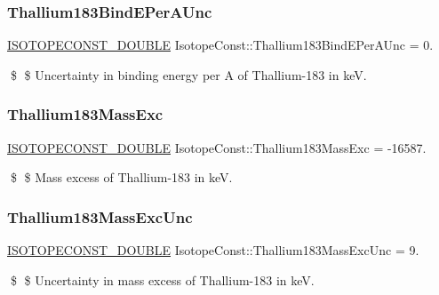 \subsubsection{\texorpdfstring{Thallium183\+Bind\+E\+Per\+A\+Unc}{Thallium183BindEPerAUnc}}
{\footnotesize\ttfamily \mbox{\hyperlink{group___isotope_const-_macros_ga8f45a7272ce02c0b4c65c44636ed719a}{I\+S\+O\+T\+O\+P\+E\+C\+O\+N\+S\+T\+\_\+\+D\+O\+U\+B\+LE}} Isotope\+Const\+::\+Thallium183\+Bind\+E\+Per\+A\+Unc = 0.}

\$ \$ Uncertainty in binding energy per A of Thallium-\/183 in keV. \mbox{\label{group___isotope_const-_thallium-_tl183_ga243d9df63fa4c64af9400a0b2d5807d2}} 
\subsubsection{\texorpdfstring{Thallium183\+Mass\+Exc}{Thallium183MassExc}}
{\footnotesize\ttfamily \mbox{\hyperlink{group___isotope_const-_macros_ga8f45a7272ce02c0b4c65c44636ed719a}{I\+S\+O\+T\+O\+P\+E\+C\+O\+N\+S\+T\+\_\+\+D\+O\+U\+B\+LE}} Isotope\+Const\+::\+Thallium183\+Mass\+Exc = -\/16587.}

\$ \$ Mass excess of Thallium-\/183 in keV. \mbox{\label{group___isotope_const-_thallium-_tl183_gad3658abe91de392921952a21cdca943c}} 
\subsubsection{\texorpdfstring{Thallium183\+Mass\+Exc\+Unc}{Thallium183MassExcUnc}}
{\footnotesize\ttfamily \mbox{\hyperlink{group___isotope_const-_macros_ga8f45a7272ce02c0b4c65c44636ed719a}{I\+S\+O\+T\+O\+P\+E\+C\+O\+N\+S\+T\+\_\+\+D\+O\+U\+B\+LE}} Isotope\+Const\+::\+Thallium183\+Mass\+Exc\+Unc = 9.}

\$ \$ Uncertainty in mass excess of Thallium-\/183 in keV. \mbox{\label{group___isotope_const-_thallium-_tl183_gae67694a7bb66f9f10f64f0383a5bffbd}} 
